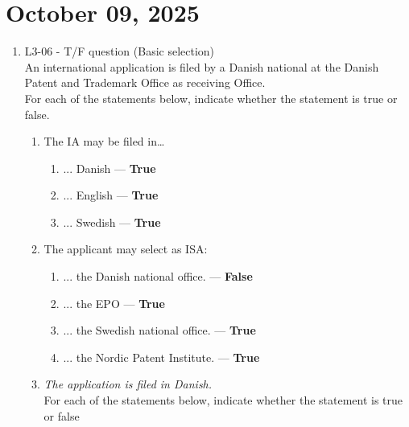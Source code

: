 \documentclass{report}
\begin{document}
    \section{October 09, 2025}

\begin{enumerate}[label=\textbf{Answer \arabic*}]

    \item %
    L3-06 - T/F question (Basic selection) \\
    An international application is filed by a Danish national at the Danish Patent and Trademark Office as receiving Office. \\
    For each of the statements below, indicate whether the statement is true or false.
    \begin{enumerate}[label=(\alph*)]
        \item The IA may be filed in…
        \begin{enumerate}[label={(\alph{enumi}.\arabic*)}]
            \item ... Danish --- \textbf{True}
            \item ... English --- \textbf{True}
            \item ... Swedish --- \textbf{True}
        \end{enumerate}

        \item The applicant may select as ISA:
        \begin{enumerate}[label={(\alph{enumi}.\arabic*)}]
            \item ... the Danish national office. --- \textbf{False}
            \item ... the EPO --- \textbf{True}
            \item ... the Swedish national office. --- \textbf{True}
            \item ... the Nordic Patent Institute. --- \textbf{True}
        \end{enumerate}
        
        \item \textit{The application is filed in Danish.} \\
        For each of the statements below, indicate whether the statement is true or false
        

\end{enumerate}
\end{enumerate}
\end{document}
